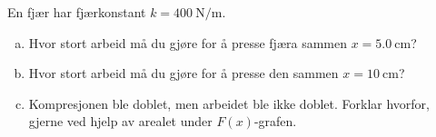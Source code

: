 %
En fjær har fjærkonstant $k = \SI{400}{\newton\per\metre}$.
\begin{enumerate}[a)]
    \item Hvor stort arbeid må du gjøre for å presse fjæra sammen $x = \SI{5.0}{\centi\metre}$?
    \item Hvor stort arbeid må du gjøre for å presse den sammen $x = \SI{10}{\centi\metre}$?
    \item Kompresjonen ble doblet, men arbeidet ble ikke doblet. Forklar hvorfor, gjerne ved hjelp av arealet under $F(x)$-grafen.
\end{enumerate}
